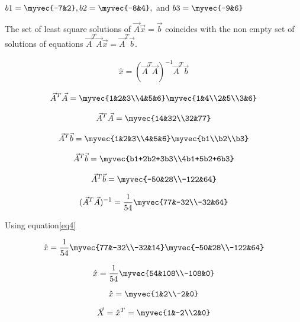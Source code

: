 \documentclass[journal,12pt,twocolumn]{IEEEtran}
\begin{document}
$b1=\myvec{-7&2}, b2=\myvec{-8&4}, $ and $b3=\myvec{-9&6}$

The set of least square solutions of $\vec{A}\vec{x}=\vec{b}$ coincides with the non empty set of solutions of equations $\vec{A}^T\vec{A}\vec{x}=\vec{A}^T\vec{b}.$ 

\begin{align}\label{eq4}
 \hat{x}=(\vec{A}^T\vec{A})^{-1}\vec{A}^T\vec{b} 
\end{align}

\begin{align*}
\vec{A}^T\vec{A}=\myvec{1&2&3\\4&5&6}\myvec{1&4\\2&5\\3&6}
\end{align*}

\begin{align*}
\vec{A}^T\vec{A}=\myvec{14&32\\32&77}
\end{align*}

\begin{align*}
\vec{A}^T\vec{b}=\myvec{1&2&3\\4&5&6}\myvec{b1\\b2\\b3}   
\end{align*}

\begin{align*}
\vec{A}^T\vec{b}=\myvec{b1+2b2+3b3\\4b1+5b2+6b3}
\end{align*}

\begin{align*}
\vec{A}^T\vec{b}=\myvec{-50&28\\-122&64}
\end{align*}

\begin{align*}
(\vec{A}^T\vec{A})^{-1}=\frac{1}{54}\myvec{77&-32\\-32&64} 
\end{align*}

Using equation\eqref{eq4} 

$$\hat{x}=\frac{1}{54}\myvec{77&-32\\-32&14}\myvec{-50&28\\-122&64}$$

$$\hat{x}=\frac{1}{54}\myvec{54&108\\-108&0}$$

$$\hat{x}=\myvec{1&2\\-2&0}$$

$$\vec{X}=\hat{x}^T=\myvec{1&-2\\2&0}$$
\end{document}
